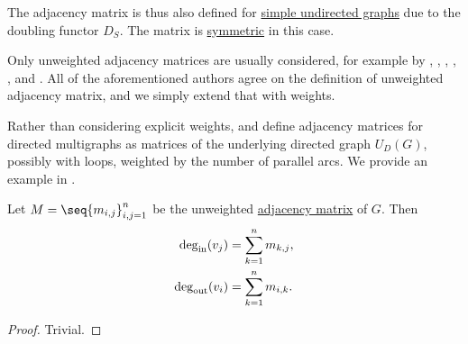 \begin{comments}
  \item The adjacency matrix is thus also defined for \hyperref[def:undirected_graph]{simple undirected graphs} due to the doubling functor \hyperref[def:graph_functors/simple_doubling]{\( D_S \)}. The matrix is \hyperref[def:transpose_matrix]{symmetric} in this case.

  \item Only unweighted adjacency matrices are usually considered, for example by , , , , ,  and . All of the aforementioned authors agree on the definition of unweighted adjacency matrix, and we simply extend that with weights.

  \item Rather than considering explicit weights,  and  define adjacency matrices for directed multigraphs as matrices of the underlying directed graph \hyperref[def:graph_functors/directed_forgetful]{\( U_D(G) \)}, possibly with loops, weighted by the number of parallel arcs. We provide an example in .
\end{comments}

\begin{proposition}\label{thm:adjacency_matrix_degree}
  Let \( M = \seq{ m_{i,j} }_{i,j=1}^n \) be the unweighted \hyperref[def:graph_adjacency_matrix]{adjacency matrix} of \( G \). Then
  \begin{align*}
    \deg_{\op{in}}(v_j)  &= \sum_{k=1}^n m_{k,j}, \\
    \deg_{\op{out}}(v_i) &= \sum_{k=1}^n m_{i,k}.
  \end{align*}
\end{proposition}
\begin{proof}
  Trivial.
\end{proof}

